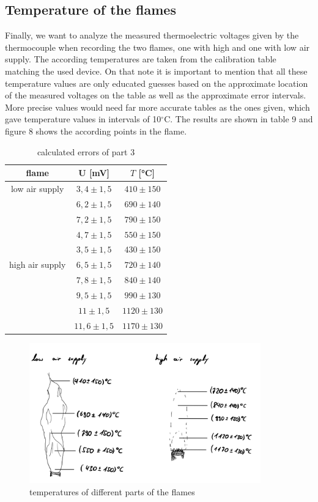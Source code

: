 \documentclass{article}
\begin{document}
\newpage

\subsection{Temperature of the flames}

Finally, we want to analyze the measured thermoelectric voltages given by the thermocouple when recording the two flames, one with high and one with low air supply. The according temperatures are taken from the calibration table matching the used device. On that note it is important to mention that all these temperature values are only educated guesses based on the approximate location of the measured voltages on the table as well as the approximate error intervals. More precise values would need far more accurate tables as the ones given, which gave temperature values in intervals of 10$^{\circ}$C. The results are shown in table 9 and figure 8 shows the according points in the flame.

\begin{table}[!ht]
    \centering
    \begin{tabular}{c|c|c}
        \textbf{flame} & \textbf{$\bm{U}$} [mV] & $T$ [°C] \\ \hline
        low air supply & $3,4 \pm 1,5$ & $410 \pm 150$ \\ 
        ~ & $6,2 \pm 1,5$ & $690 \pm 140$ \\ 
        ~ & $7,2 \pm 1,5$ & $790 \pm 150$ \\ 
        ~ & $4,7 \pm 1,5$ & $550 \pm 150$ \\ 
        ~ & $3,5 \pm 1,5$ & $430 \pm 150$ \\ \hline
        high air supply & $6,5 \pm 1,5$ & $720 \pm 140$ \\ 
        ~ & $7,8 \pm 1,5$ & $840 \pm 140$ \\ 
        ~ & $9,5 \pm 1,5$ & $990 \pm 130$ \\ 
        ~ & $11 \pm 1,5$ & $1120 \pm 130$ \\ 
        ~ & $11,6 \pm 1,5$ & $1170 \pm 130$ \\ 
    \end{tabular}
    \caption{calculated errors of part 3}
\end{table}

\begin{figure} [!h]
    \centering
    \includegraphics[width=10cm]{graphics/sketchflame.jpg}
    \caption{temperatures of different parts of the flames}
\end{figure}
\end{document}
